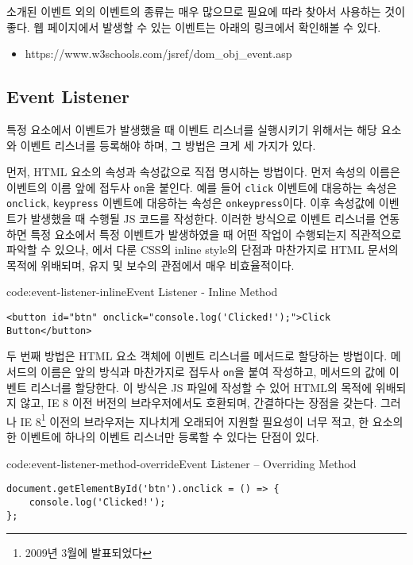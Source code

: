 소개된 이벤트 외의 이벤트의 종류는 매우 많으므로 필요에 따라 찾아서 사용하는 것이 좋다. 웹 페이지에서 발생할 수 있는 이벤트는 아래의 링크에서 확인해볼 수 있다.

\begin{itemize}
    \item https://www.w3schools.com/jsref/dom\_obj\_event.asp
\end{itemize}

\subsection*{Event Listener}

특정 요소에서 이벤트가 발생했을 때 이벤트 리스너를 실행시키기 위해서는 해당 요소와 이벤트 리스너를 등록해야 하며, 그 방법은 크게 세 가지가 있다.

먼저, HTML 요소의 속성과 속성값으로 직접 명시하는 방법이다. 먼저 속성의 이름은 이벤트의 이름 앞에 접두사 \texttt{on}을 붙인다. 예를 들어 \texttt{click} 이벤트에 대응하는 속성은 \texttt{onclick}, \texttt{keypress} 이벤트에 대응하는 속성은 \texttt{onkeypress}이다. 이후 속성값에 이벤트가 발생했을 때 수행될 JS 코드를 작성한다. 이러한 방식으로 이벤트 리스너를 연동하면 특정 요소에서 특정 이벤트가 발생하였을 때 어떤 작업이 수행되는지 직관적으로 파악할 수 있으나, 에서 다룬 CSS의 inline style의 단점과 마찬가지로 HTML 문서의 목적에 위배되며, 유지 및 보수의 관점에서 매우 비효율적이다.

\begin{codeenv}{code:event-listener-inline}{Event Listener - Inline Method}\begin{verbatim}
<button id="btn" onclick="console.log('Clicked!');">Click Button</button>
\end{verbatim}
\end{codeenv}

두 번째 방법은 HTML 요소 객체에 이벤트 리스너를 메서드로 할당하는 방법이다. 메서드의 이름은 앞의 방식과 마찬가지로 접두사 \texttt{on}을 붙여 작성하고, 메서드의 값에 이벤트 리스너를 할당한다. 이 방식은 JS 파일에 작성할 수 있어 HTML의 목적에 위배되지 않고, IE 8 이전 버전의 브라우저에서도 호환되며, 간결하다는 장점을 갖는다. 그러나 IE 8\footnote{2009년 3월에 발표되었다} 이전의 브라우저는 지나치게 오래되어 지원할 필요성이 너무 적고, 한 요소의 한 이벤트에 하나의 이벤트 리스너만 등록할 수 있다는 단점이 있다.

\begin{codeenv}{code:event-listener-method-override}{Event Listener – Overriding Method}\begin{verbatim}
document.getElementById('btn').onclick = () => {
    console.log('Clicked!');
};
\end{verbatim}
\end{codeenv}


